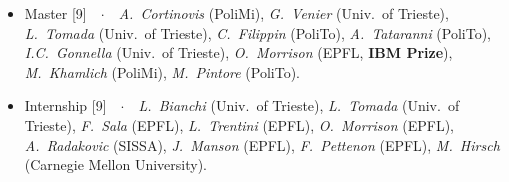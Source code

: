 \documentclass[
  usegeometry%
]{scrartcl}
\begin{document}
\begin{cv}{}
{\begin{itemize}
    \item[$\circ$] {\color{PineGreen}Master} [9]\ \ $\cdotp$\ \  \textit{A.\ Cortinovis} (PoliMi), \textit{G.\ Venier} (Univ.\ of Trieste), \textit{L.\ Tomada} (Univ.\ of Trieste), \textit{C.\ Filippin} (PoliTo), \textit{A.\ Tataranni} (PoliTo), \textit{I.C.\ Gonnella} (Univ.\ of Trieste), \textit{O.\ Morrison} (EPFL, \textbf{IBM Prize}), \textit{M.\ Khamlich} (PoliMi), \textit{M.\ Pintore} (PoliTo).
    \item[$\circ$] {\color{NavyBlue}Internship} [9]\ \ $\cdotp$\ \  \textit{L.\ Bianchi} (Univ.\ of Trieste), \textit{L.\ Tomada} (Univ.\ of Trieste), \textit{F.\ Sala} (EPFL), \textit{L.\ Trentini} (EPFL), \textit{O.\ Morrison} (EPFL), \textit{A.\ Radakovic} (SISSA), \textit{J.\ Manson} (EPFL), \textit{F.\ Pettenon} (EPFL), \textit{M.\ Hirsch} (Carnegie Mellon University).
\end{itemize}}
\vspace{-0.5em}


\end{cv}
\end{document}

